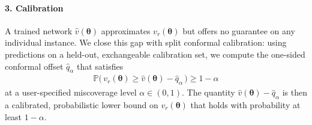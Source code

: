 \documentclass[10pt]{article} %
\theoremstyle{plain}
\theoremstyle{definition}
\theoremstyle{remark}
\begin{document}
\paragraph{3. Calibration} A trained network $\hat{v}(\bm{\theta})$ approximates $v_r(\bm{\theta})$ but offers no guarantee on any individual instance. We close this gap with split conformal calibration: using predictions on a held-out, exchangeable calibration set, we compute the one-sided conformal offset $\hat{q}_\alpha$ that satisfies
\begin{align*}
    \mathbb{P} \big( \, v_r(\bm{\theta}) \geq \hat{v}(\bm{\theta}) - \hat{q}_\alpha \, \big) \geq 1 - \alpha
\end{align*} at a user-specified miscoverage level $\alpha \in (0, 1)$. The quantity $\hat{v}(\bm{\theta}) - \hat{q}_\alpha$ is then a calibrated, probabilistic lower bound on $v_r(\bm{\theta})$ that holds with probability at least $1 - \alpha$.
\end{document}
